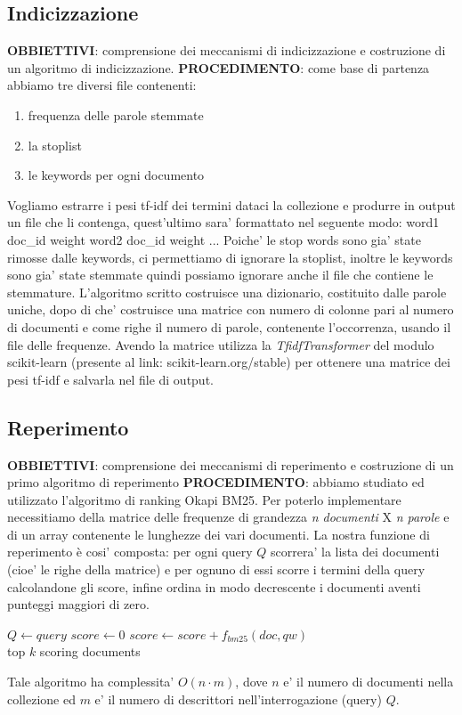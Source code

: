 \subsection{Indicizzazione} \label{sec:metodi-di-indic}

\textbf{OBBIETTIVI}: comprensione dei meccanismi di indicizzazione e costruzione di un algoritmo di indicizzazione.
\textbf{PROCEDIMENTO}: come base di partenza abbiamo tre diversi file contenenti: \begin{enumerate}\item frequenza delle parole stemmate \item la stoplist \item le keywords per ogni documento \end{enumerate}
Vogliamo estrarre i pesi tf-idf dei termini dataci la collezione e produrre in output un file che li contenga, quest'ultimo sara' formattato nel seguente modo: 
word1  doc_id  weight
word2  doc_id  weight
...
Poiche' le stop words sono gia' state rimosse dalle keywords, ci permettiamo di ignorare la stoplist, inoltre le keywords sono gia' state stemmate quindi possiamo ignorare anche il file che contiene le stemmature.
L'algoritmo scritto costruisce una dizionario, costituito dalle parole uniche, dopo di che' costruisce una matrice con numero di colonne pari al numero di documenti e come righe il numero di parole, contenente l'occorrenza, usando il file delle frequenze. Avendo la matrice utilizza la \textit{TfidfTransformer} del modulo scikit-learn (presente al link: scikit-learn.org/stable) per ottenere una matrice dei pesi tf-idf e salvarla nel file di output.

\subsection{Reperimento}
\label{sec:metodi-di-reper}

\textbf{OBBIETTIVI}: comprensione dei meccanismi di reperimento e costruzione di un primo algoritmo di reperimento
\textbf{PROCEDIMENTO}: abbiamo studiato ed utilizzato l'algoritmo di ranking Okapi BM25. Per poterlo implementare necessitiamo della matrice delle frequenze di grandezza \textit{n documenti} X \textit{n parole} e di un array contenente le lunghezze dei vari documenti.
La nostra funzione di reperimento è cosi' composta: per ogni query $Q$ scorrera' la lista dei documenti (cioe' le righe della matrice) e per ognuno di essi scorre i termini della query calcolandone gli score, infine ordina in modo decrescente i documenti aventi punteggi maggiori di zero.
\begin{algorithmic}
\State $Q \gets query$
    \State $score\gets 0$
        \State $score \gets score + f_{bm25}(doc, qw)$
    \EndFor
\EndFor\\
\Return top $k$ scoring documents
\end{algorithmic}
Tale algoritmo ha complessita' $O(n \cdot m)$, dove $n$ e' il numero di documenti nella collezione ed $m$ e' il numero di descrittori nell'interrogazione (query) $Q$.

